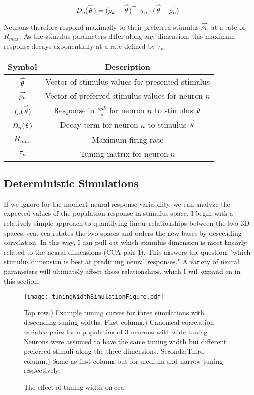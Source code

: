 \begin{equation}
	\label{eq:decay}
	D_n(\overset{\rightharpoonup}\theta) = (\overset{\rightharpoonup}{\rho_n} -\overset{\rightharpoonup}\theta)^\top \cdot \tau_n \cdot (\overset{\rightharpoonup}\theta-\overset{\rightharpoonup}{\rho_n})
\end{equation}

Neurons therefore respond maximally to their preferred stimulus $\overset{\rightharpoonup}{\rho_n}$ at a rate of $R_{max}$. As the stimulus parameters differ along any dimension, this maximum response decays exponentially at a rate defined by $\tau_n$.

\begin{table}
	\centering
	\begin{tabular}{|c|c|}
		\hline
		\textbf{Symbol}       & \textbf{Description} \\
		\hline
		$\overset{\rightharpoonup}\theta$      & Vector of stimulus values for presented stimulus \\
		$\overset{\rightharpoonup}{\rho_n}$    & Vector of preferred stimulus values for neuron $n$ \\
		$f_n(\overset{\rightharpoonup}\theta)$ & Response in $\frac{spk}{s}$ for neuron $n$ to stimulus $\overset{\rightharpoonup}\theta$ \\
		$D_n(\overset{\rightharpoonup}\theta)$ & Decay term for neuron $n$ to stimulus $\overset{\rightharpoonup}\theta$ \\
		$R_{max}$             & Maximum firing rate \\
		$\tau_n$              & Tuning matrix for neuron $n$ \\
		\hline
	\end{tabular}
	\label{tbl:symbols}
\end{table}


\subsection{Deterministic Simulations}
If we ignore for the moment neural response variability, we can analyze the expected values of the population response in stimulus space. I begin with a relatively simple approach to quantifying linear relationships between the two 3D spaces, \gls{cca}. \gls{cca} rotates the two spaces and orders the new bases by descending correlation. In this way, I can pull out which stimulus dimension is most linearly related to the neural dimensions (CCA pair 1). This answers the question: "which stimulus dimension is best at predicting neural responses." A variety of neural parameters will ultimately affect these relationships, which I will expand on in this section. 

\begin{figure}
	\centering
	\texttt{[image: tuningWidthSimulationFigure.pdf]}
	\caption{The effect of tuning width on \gls{cca}.}{Top row.) Example tuning curves for three simulations with descending tuning widths. First column.) Canonical correlation variable pairs for a population of 3 neurons with wide tuning. Neurons were assumed to have the same tuning width but different preferred stimuli along the three dimensions. Second\&Third column.) Same as first column but for medium and narrow tuning respectively.}
	\label{fig:ccaTuning}
\end{figure}

